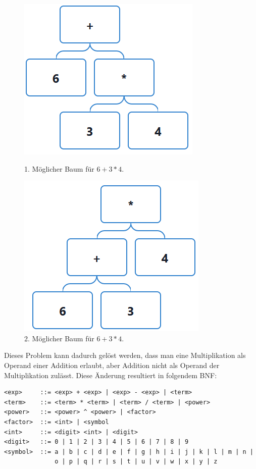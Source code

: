 \documentclass[11pt]{article}
\begin{document}
\begin{figure}[h]
\begin{minipage}{.5\textwidth}
  \centering
  \includegraphics[scale=0.5]{trees/beispiel_bnf_2_1.png}
  \caption{1. Möglicher Baum für $6+3*4$.}
\end{minipage}
\begin{minipage}{.5\textwidth}
  \centering
  \includegraphics[scale=0.5]{trees/beispiel_bnf_2_2.png}
  \caption{2. Möglicher Baum für $6+3*4$.}
\end{minipage}
\end{figure}

Dieses Problem kann dadurch gelöst werden, dass man eine Multiplikation als 
Operand einer Addition erlaubt, aber Addition nicht als Operand der Multiplikation 
zulässt. Diese Änderung resultiert in folgendem BNF:

\begin{verbatim}
<exp>     ::= <exp> + <exp> | <exp> - <exp> | <term>
<term>    ::= <term> * <term> | <term> / <term> | <power>
<power>   ::= <power> ^ <power> | <factor>
<factor>  ::= <int> | <symbol 
<int>     ::= <digit> <int> | <digit>
<digit>   ::= 0 | 1 | 2 | 3 | 4 | 5 | 6 | 7 | 8 | 9
<symbol>  ::= a | b | c | d | e | f | g | h | i | j | k | l | m | n | 
              o | p | q | r | s | t | u | v | w | x | y | z
\end{verbatim}
\end{document}
